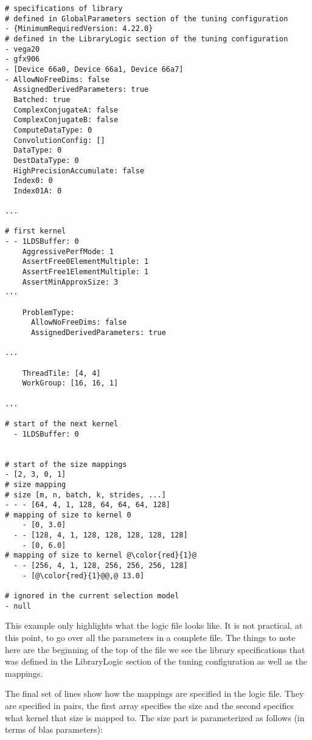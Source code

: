 \documentclass[]{article}
\begin{document}
\begin{verbatim}
# specifications of library
# defined in GlobalParameters section of the tuning configuration
- {MinimumRequiredVersion: 4.22.0}
# defined in the LibraryLogic section of the tuning configuration
- vega20
- gfx906
- [Device 66a0, Device 66a1, Device 66a7]
- AllowNoFreeDims: false
  AssignedDerivedParameters: true
  Batched: true
  ComplexConjugateA: false
  ComplexConjugateB: false
  ComputeDataType: 0
  ConvolutionConfig: []
  DataType: 0
  DestDataType: 0
  HighPrecisionAccumulate: false
  Index0: 0
  Index01A: 0

...

# first kernel
- - 1LDSBuffer: 0
    AggressivePerfMode: 1
    AssertFree0ElementMultiple: 1
    AssertFree1ElementMultiple: 1
    AssertMinApproxSize: 3
...

    ProblemType:
      AllowNoFreeDims: false
      AssignedDerivedParameters: true
      
...

    ThreadTile: [4, 4]
    WorkGroup: [16, 16, 1]

...

# start of the next kernel
  - 1LDSBuffer: 0


# start of the size mappings
- [2, 3, 0, 1]
# size mapping
# size [m, n, batch, k, strides, ...]
- - - [64, 4, 1, 128, 64, 64, 64, 128]
# mapping of size to kernel 0
    - [0, 3.0]
  - - [128, 4, 1, 128, 128, 128, 128, 128]
    - [0, 6.0]
# mapping of size to kernel @\color{red}{1}@
  - - [256, 4, 1, 128, 256, 256, 256, 128]
    - [@\color{red}{1}@@,@ 13.0]

# ignored in the current selection model
- null

\end{verbatim}

This example only highlights what the logic file looks like. It is not practical, at this point, to go over all the parameters in a complete file. The things to note here are the beginning of the top of the file we see the library specifications that was defined in the LibraryLogic section of the tuning configuration as well as the mappings.
 
The final set of lines show how the mappings are specified in the logic file. They are specified in pairs, the first array specifies the size and the second specifics what kernel that size is mapped to. The size part is parameterized as follows (in terms of blas parameters):
 
\end{document}
